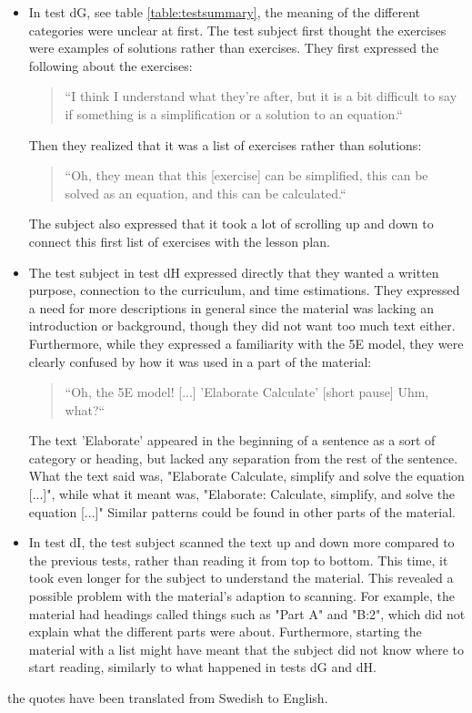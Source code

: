 \begin{itemize}
  \item In test dG, see table \ref{table:testsummary}, the meaning of the different categories were unclear at first. The test subject first thought the exercises were examples of solutions rather than exercises. They first expressed the following about the exercises:
		\begin{quote}
			“I think I understand what they're after, but it is a bit difficult to say if something is a simplification or a solution to an equation.“
		\end{quote}
		Then they realized that it was a list of exercises rather than solutions:
		\begin{quote}
			“Oh, they mean that this [exercise] can be simplified, this can be solved as an equation, and this can be calculated.“
		\end{quote}
		The subject also expressed that it took a lot of scrolling up and down to connect this first list of exercises with the lesson plan.
  \item The test subject in test dH expressed directly that they wanted a written purpose, connection to the curriculum, and time estimations. They expressed a need for more descriptions in general since the material was lacking an introduction or background, though they did not want too much text either. Furthermore, while they expressed a familiarity with the 5E model, they were clearly confused by how it was used in a part of the material:
		\begin{quote}
			“Oh, the 5E model! [...] 'Elaborate Calculate' [short pause] Uhm, what?“
		\end{quote}
		The text 'Elaborate' appeared in the beginning of a sentence as a sort of category or heading, but lacked any separation from the rest of the sentence. What the text said was, "Elaborate Calculate, simplify and solve the equation [...]", while what it meant was, "Elaborate: Calculate, simplify, and solve the equation [...]" Similar patterns could be found in other parts of the material.
  \item In test dI, the test subject scanned the text up and down more compared to the previous tests, rather than reading it from top to bottom. This time, it took even longer for the subject to understand the material. This revealed a possible problem with the material's adaption to scanning. For example, the material had headings called things such as "Part A" and "B:2", which did not explain what the different parts were about. Furthermore, starting the material with a list might have meant that the subject did not know where to start reading, similarly to what happened in tests dG and dH.
\end{itemize}
 the quotes have been translated from Swedish to English.

